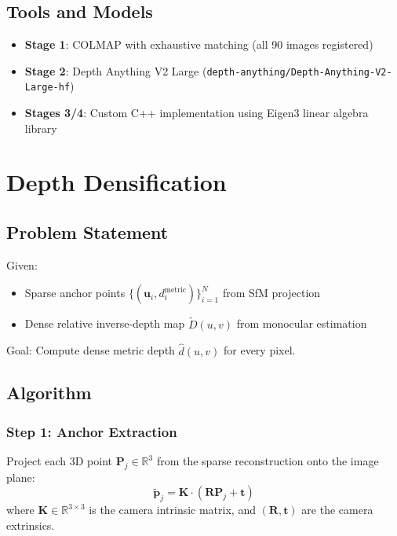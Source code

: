 \documentclass[11pt,a4paper]{article}
\begin{document}
\subsection{Tools and Models}

\begin{itemize}[noitemsep]
    \item \textbf{Stage 1}: COLMAP with exhaustive matching (all 90 images registered)
    \item \textbf{Stage 2}: Depth Anything V2 Large (\texttt{depth-anything/Depth-Anything-V2-Large-hf})
    \item \textbf{Stages 3/4}: Custom C++ implementation using Eigen3 linear algebra library
\end{itemize}

\section{Depth Densification}

\subsection{Problem Statement}

Given:
\begin{itemize}[noitemsep]
    \item Sparse anchor points $\{(\mathbf{u}_i, d_i^{\text{metric}})\}_{i=1}^{N}$ from SfM projection
    \item Dense relative inverse-depth map $\tilde{D}(u,v)$ from monocular estimation
\end{itemize}

\noindent Goal: Compute dense metric depth $\hat{d}(u,v)$ for every pixel.

\subsection{Algorithm}

\subsubsection{Step 1: Anchor Extraction}

Project each 3D point $\mathbf{P}_j \in \mathbb{R}^3$ from the sparse reconstruction onto the image plane:
\begin{equation}
\tilde{\mathbf{p}}_j = \mathbf{K} \cdot (\mathbf{R} \mathbf{P}_j + \mathbf{t})
\end{equation}
where $\mathbf{K} \in \mathbb{R}^{3\times 3}$ is the camera intrinsic matrix, and $(\mathbf{R}, \mathbf{t})$ are the camera extrinsics.
\end{document}
